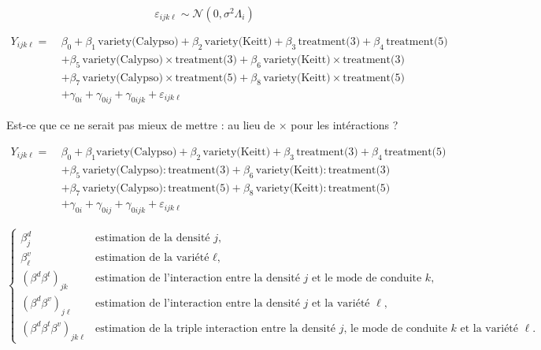 \documentclass[a4paper, landscape, 11pt]{article}
\begin{document}
\[
\varepsilon_{ijk\ell} \sim \mathcal{N}\left( 0, \sigma^2\Lambda_i \right)
\]


\newpage

\begin{align*}
 Y_{ijk\ell} = \ &\beta_0 + \beta_1\, \text{variety(Calypso)} + \beta_{2}\, \text{variety(Keitt)} + \beta_{3}\, \text{treatment(3)} + \beta_4\, \text{treatment(5)}\\
 & + \beta_5\, \text{variety(Calypso)} \times \text{treatment(3)} + \beta_6\, \text{variety(Keitt)} \times \text{treatment(3)} \\
 & + \beta_7\, \text{variety(Calypso)} \times \text{treatment(5)} + \beta_8\, \text{variety(Keitt)} \times \text{treatment(5)} \\
 & + \gamma_{0i} + \gamma_{0ij} + \gamma_{0ijk} + \varepsilon_{ijk\ell}
\end{align*}

\vspace*{2cm}

Est-ce que ce ne serait pas mieux de mettre : au lieu de $\times$ pour les intéractions ?

\vspace*{1cm}

\begin{align*}
 Y_{ijk\ell} = \ &\beta_0 + \beta_1 \text{variety(Calypso)} + \beta_{2}\, \text{variety(Keitt)} + \beta_{3}\, \text{treatment(3)} + \beta_4\, \text{treatment(5)}\\
 & + \beta_5 \, \text{variety(Calypso)} \colon \! \text{treatment(3)} + \beta_6\, \text{variety(Keitt)} \colon \! \text{treatment(3)} \\
 & + \beta_7\, \text{variety(Calypso)} \colon \! \text{treatment(5)} + \beta_8\, \text{variety(Keitt)} \colon \! \text{treatment(5)} \\
 & + \gamma_{0i} + \gamma_{0ij} + \gamma_{0ijk} + \varepsilon_{ijk\ell}
\end{align*}
\newpage

\[
\begin{cases}
 \beta_j^d & \text{estimation de la densité $j$,}\\
 \beta_\ell^v & \text{estimation de la variété $\ell$,}\\
 \left( \beta^d\beta^t \right)_{jk} & \text{estimation de l'interaction entre la densité $j$ et le mode de conduite $k$,}\\
 \left( \beta^d\beta^v \right)_{j\ell} & \text{estimation de l'interaction entre la densité $j$ et la variété $\ell$,}\\
 \left( \beta^d\beta^t\beta^v \right)_{jk\ell} & \text{estimation de la triple interaction entre la densité $j$, le mode de conduite $k$ et la variété $\ell$.}
\end{cases}
\]
\end{document}

